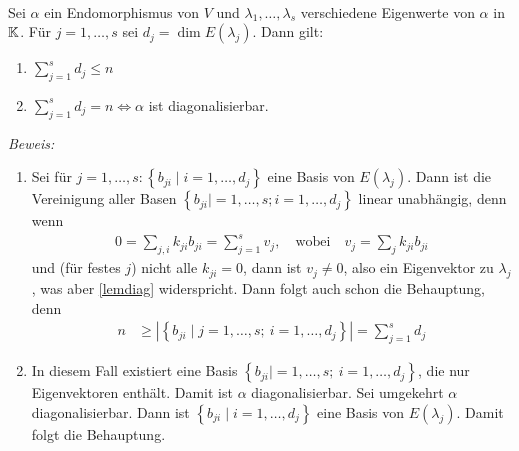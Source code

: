\begin{mysatz}\ \\
    Sei $\alpha$ ein Endomorphismus von $V$ und $\lambda_1,\ldots,\lambda_s$ verschiedene Eigenwerte von $\alpha$ in $\mathbb{K}$. Für $j=1,\ldots,s$ sei $d_j=\dim E(\lambda_j)$. Dann gilt:
    \begin{enumerate}
        \item $\sum\limits_{j=1}^s d_j \leq n$
        \item $\sum\limits_{j=1}^s d_j = n \Leftrightarrow \alpha$ ist diagonalisierbar.
    \end{enumerate}

    \textit{Beweis:}
    \begin{enumerate}
        \item Sei für $j=1,\ldots,s: \left\{ b_{ji} \mid i=1,\ldots,d_j \right\}$ eine Basis von $E(\lambda_j)$. Dann ist die Vereinigung aller Basen $\left\{ b_{ji}|=1,\ldots,s; i=1,\ldots,d_j \right\}$ linear unabhängig, denn wenn
            \begin{align*}
                0 = \sum_{j,i} k_{ji}b_{ji} = \sum_{j=1}^s v_j, \quad \mbox{wobei} \quad v_j = \sum_j k_{ji} b_{ji}
            \end{align*}
            und (für festes $j$) nicht alle $k_{ji}=0$, dann ist $v_j \neq 0$, also ein Eigenvektor zu $\lambda_j$, was aber \ref{lemdiag} widerspricht. Dann folgt auch schon die Behauptung, denn
            \begin{align*}
                n & \geq \left|\left\{ b_{ji} \mid j = 1,\ldots,s;\ i=1,\ldots,d_j \right\} \right| = \sum_{j=1}^s d_j
            \end{align*}
        \item In diesem Fall existiert eine Basis $\left\{ b_{ji} \mid =1,\ldots,s;\ i=1,\ldots,d_j \right\}$, die nur Eigenvektoren enthält. Damit ist $\alpha$ diagonalisierbar. Sei umgekehrt $\alpha$ diagonalisierbar. Dann ist $\left\{ b_{ji} \mid i=1,\ldots,d_j \right\}$ eine Basis von $E(\lambda_j)$. Damit folgt die Behauptung.
    \end{enumerate}
\end{mysatz}

\newpage

